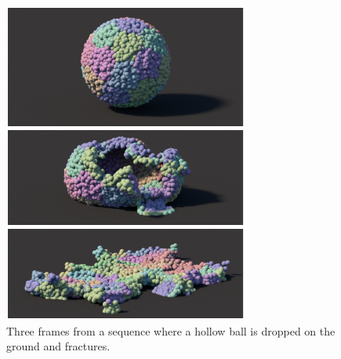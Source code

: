 \documentclass[conference]{acmsiggraph}
\begin{document}
\begin{figure}[h!]
\includegraphics[width=\linewidth]{Figures/fracturedball.pdf}
\caption{Three frames from a sequence where a hollow ball is dropped on the ground and fractures.  }
\label{fig:hollowball}
\end{figure}
\end{document}
